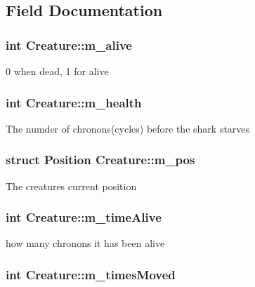 \subsection{\-Field \-Documentation}
\hypertarget{structCreature_a8d083e8a98c019ef6d3317bebda5a552}{
\subsubsection[{m\-\_\-alive}]{\setlength{\rightskip}{0pt plus 5cm}int {\bf \-Creature\-::m\-\_\-alive}}}\label{structCreature_a8d083e8a98c019ef6d3317bebda5a552}
0 when dead, 1 for alive \hypertarget{structCreature_a7ee7518a06a266abff11add056aaf320}{
\subsubsection[{m\-\_\-health}]{\setlength{\rightskip}{0pt plus 5cm}int {\bf \-Creature\-::m\-\_\-health}}}\label{structCreature_a7ee7518a06a266abff11add056aaf320}
\-The numder of chronons(cycles) before the shark starves \hypertarget{structCreature_a6c2bfc56229ac81d02fc190b70c95529}{
\subsubsection[{m\-\_\-pos}]{\setlength{\rightskip}{0pt plus 5cm}struct {\bf \-Position} {\bf \-Creature\-::m\-\_\-pos}}}\label{structCreature_a6c2bfc56229ac81d02fc190b70c95529}
\-The creatures current position \hypertarget{structCreature_a490bf0cfa104604cebd15859e8f0c864}{
\subsubsection[{m\-\_\-time\-Alive}]{\setlength{\rightskip}{0pt plus 5cm}int {\bf \-Creature\-::m\-\_\-time\-Alive}}}\label{structCreature_a490bf0cfa104604cebd15859e8f0c864}
how many chronons it has been alive \hypertarget{structCreature_ad3b63266be858ba31c0b5dbda49f8c37}{
\subsubsection[{m\-\_\-times\-Moved}]{\setlength{\rightskip}{0pt plus 5cm}int {\bf \-Creature\-::m\-\_\-times\-Moved}}}\label{structCreature_ad3b63266be858ba31c0b5dbda49f8c37}
